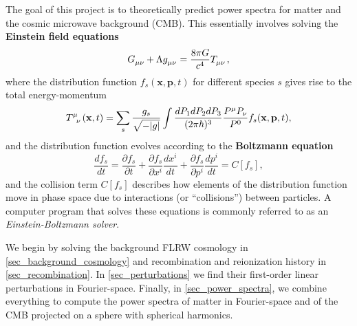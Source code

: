 \documentclass[10pt,a4paper]{article}
\begin{document}
The goal of this project is to theoretically predict
power spectra for matter and the cosmic microwave background (CMB).
This essentially involves solving the \textbf{Einstein field equations}
\begin{equation}
	G\indices{_\mu_\nu} + \Lambda g\indices{_\mu_\nu} = \frac{8 \pi G}{c^4} T\indices{_\mu_\nu},
\label{eq_einstein}
\end{equation}
where the distribution function $f_s(\mathbf{x},\mathbf{p},t)$ for different species $s$
gives rise to the total energy-momentum
\begin{equation}
	T\indices{^\mu_\nu}(\mathbf{x},t) = \sum_s \frac{g_s}{\sqrt{-|g|}} \int \frac{dP_1 dP_2 dP_3}{(2\pi\hbar)^3} \frac{P^\mu P_\nu}{P^0} f_s(\mathbf{x},\mathbf{p},t),
\label{eq_energy_momentum}
\end{equation}
and the distribution function evolves according to the \textbf{Boltzmann equation}
\begin{equation}
	\frac{df_s}{dt} = \frac{\partial f_s}{\partial t} + \frac{\partial f_s}{\partial x^i} \frac{dx^i}{dt} + \frac{\partial f_s}{\partial p^i} \frac{d p^i}{dt} = C[f_s],
\label{eq_boltzmann}
\end{equation}
and the collision term $C[f_s]$ describes how
elements of the distribution function move in phase space
due to interactions (or ``collisions'') between particles.
A computer program that solves these equations
is commonly referred to as an \emph{Einstein-Boltzmann solver}.

We begin by
solving the background FLRW cosmology in \cref{sec_background_cosmology}
and recombination and reionization history in \cref{sec_recombination}.
In \cref{sec_perturbations} we find their first-order linear perturbations in Fourier-space.
Finally, in \cref{sec_power_spectra}, we combine everything
to compute the power spectra of matter in Fourier-space
and of the CMB projected on a sphere with spherical harmonics.
\end{document}
